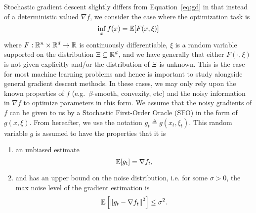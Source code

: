 Stochastic gradient descent slightly differs from Equation~\ref{eq:gd} in that
instead of a deterministic valued $\nabla f$, we consider the case where the
optimization task is 
\begin{equation}
    \inf_x f(x) = \mathbb E[F(x, \xi)]
\end{equation}
where $F:\mathbb R^n \times \mathbb R^d \rightarrow \mathbb R$ is continuously differentiable, $\xi
$ is a random variable supported on the distribution $\Xi \subseteq \mathbb R^d$, and we have generally that
either $F(\cdot, \xi)$ is not given explicitly and/or the distribution of $\Xi$
is unknown. This is the case for most machine learning problems and hence is
important to study alongside general gradient descent methods. In these cases,
we may only rely upon the known properties of $f$ (e.g.\ $\beta$-smooth,
convexity, etc) and the noisy information in $\nabla f$ to optimize parameters
in this form. We assume that the noisy gradients of $f$ can be
given to us by a Stochastic First-Order Oracle (SFO) in the form of $g(x, \xi)$.
From hereafter, we use the notation $g_t \triangleq g(x_t, \xi_t)$.
This random variable $g$ is assumed to have the properties that it is 
\begin{enumerate}
    \item an unbiased estimate \begin{equation}\mathbb E[g_t] = \nabla
    f_t,\end{equation}
    \item and has an upper bound on the noise distribution, i.e. for some
        $\sigma > 0$, the max noise level of the gradient estimation is
        \begin{equation}
            \mathbb E \left[ \left\| g_t - \nabla f_t \right\|^2 \right] \leq \sigma^2.
        \end{equation}
\end{enumerate}


